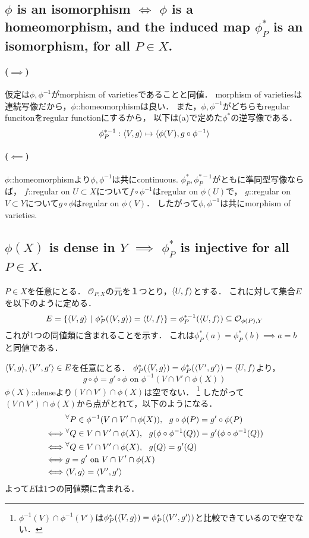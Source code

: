 \documentclass[a4paper]{jsarticle}
\begin{document}
    \subsection{$\phi$ is an isomorphism $\iff$ $\phi$ is a homeomorphism, and the induced map $\phi_P^{\ast}$ is an isomorphism, for all $P \in X$.}
    \paragraph{($\implies$)}
    仮定は$\phi, \phi^{-1}$がmorphism of varietiesであることと同値．
    morphism of varietiesは連続写像だから，$\phi$::homeomorphismは良い．
    また，$\phi, \phi^{-1}$がどちらもregular funcitonをregular functionにするから，
    以下は(a)で定めた$\phi^{\ast}$の逆写像である．
    \[ \phi_P^{\ast -1}: \langle V,g \rangle \mapsto \langle \phi(V),g \circ \phi^{-1} \rangle \]

    \paragraph{($\impliedby$)}
    $\phi$::homeomorphismより$\phi, \phi^{-1}$は共にcontinuous.
    $\phi_P^{\ast}, \phi_P^{\ast -1}$がともに準同型写像ならば，
    $f$::regular on $U \subset X$について$f \circ \phi^{-1}$はregular on $\phi(U)$で，
    $g$::regular on $V \subset Y$について$g \circ \phi$はregular on $\phi(V)$．
    したがって$\phi, \phi^{-1}$は共にmorphism of varieties.

    \subsection{$\phi(X)$ is dense in $Y$ $\implies$ $\phi_P^{\ast}$ is injective for all $P \in X$.}
    $P \in X$を任意にとる．
    $\mathcal{O}_{P, X}$の元を１つとり，$\langle U,f \rangle$とする．
    これに対して集合$E$を以下のように定める．
    \[ E=\{\langle V,g \rangle ~|~ \phi_P^{\ast}(\langle V,g \rangle)=\langle U,f \rangle \}=\phi_P^{\ast -1}(\langle U,f \rangle) \subseteq \mathcal{O}_{\phi(P), Y} \]
    これが1つの同値類に含まれることを示す．
    これは$\phi_P^{\ast}(a)=\phi_P^{\ast}(b) \implies a=b$と同値である．

    $\langle V,g \rangle, \langle V',g' \rangle \in E$を任意にとる．
    $\phi_P^{\ast}(\langle V,g \rangle)=\phi_P^{\ast}(\langle V',g' \rangle)=\langle U,f \rangle$より，
    \[ g \circ \phi=g' \circ \phi \mbox{ on } \phi^{-1}(V \cap V' \cap \phi(X)) \]
    $\phi(X)$::denseより$(V \cap V') \cap \phi(X)$は空でない．
    \footnote{$\phi^{-1}(V) \cap \phi^{-1}(V')$は$\phi_P^{\ast}(\langle V,g \rangle)=\phi_P^{\ast}(\langle V',g' \rangle)$と比較できているので空でない．}
    したがって$(V \cap V') \cap \phi(X)$から点がとれて，以下のようになる．
    \begin{align*}
    {}&     {}^{\forall} P \in \phi^{-1}(V \cap V' \cap \phi(X)),~~ g \circ \phi(P)=g' \circ \phi(P) \\
    \iff&   {}^{\forall} Q \in V \cap V' \cap \phi(X),~~ g(\phi \circ \phi^{-1}(Q))=g'(\phi \circ \phi^{-1}(Q)) \\
    \iff&   {}^{\forall} Q \in V \cap V' \cap \phi(X),~~ g(Q)=g'(Q) \\
    \iff&   g=g'\mbox{ on }V \cap V' \cap \phi(X) \\
    \iff&   \langle V,g \rangle=\langle V',g' \rangle
    \end{align*}
    よって$E$は1つの同値類に含まれる．
\end{document}
